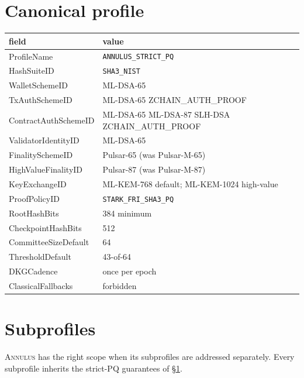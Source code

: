 \documentclass[11pt,a4paper]{article}
\newcommand{\Annulus}{\textsc{Annulus}}
\begin{document}
\section{Canonical profile}
\label{sec:profile-table}

\begin{center}\small
\begin{tabular}{l l}
\toprule
field & value \\
\midrule
ProfileName              & \texttt{ANNULUS\_STRICT\_PQ} \\
HashSuiteID              & \texttt{SHA3\_NIST} \\
WalletSchemeID           & ML-DSA-65 \\
TxAuthSchemeID           & ML-DSA-65 \textbar{} ZCHAIN\_AUTH\_PROOF \\
ContractAuthSchemeID     & ML-DSA-65 \textbar{} ML-DSA-87 \textbar{} SLH-DSA \textbar{} ZCHAIN\_AUTH\_PROOF \\
ValidatorIdentityID      & ML-DSA-65 \\
FinalitySchemeID         & Pulsar-65 (was Pulsar-M-65) \\
HighValueFinalityID      & Pulsar-87 (was Pulsar-M-87) \\
KeyExchangeID            & ML-KEM-768 default; ML-KEM-1024 high-value \\
ProofPolicyID            & \texttt{STARK\_FRI\_SHA3\_PQ} \\
RootHashBits             & 384 minimum \\
CheckpointHashBits       & 512 \\
CommitteeSizeDefault     & 64 \\
ThresholdDefault         & 43-of-64 \\
DKGCadence               & once per epoch \\
ClassicalFallbacks       & forbidden \\
\bottomrule
\end{tabular}
\end{center}

\section{Subprofiles}
\label{sec:subprofiles}

\Annulus{} has the right scope when its subprofiles are addressed
separately. Every subprofile inherits the strict-PQ guarantees of
\S\ref{sec:profile-table}.
\end{document}
